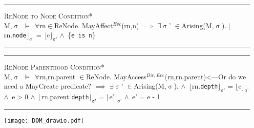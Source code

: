 \documentclass[a4paper,11pt, twoside,twocolumn]{article}
\newenvironment{logic}[1][]
{\begin{flushleft} \small }
{\end{flushleft}}
\newcommand{\loin}{$\in$}
\newcommand{\loforall}{$\forall$}
\newcommand{\loexists}{$\exists$}
\newcommand{\loand}{$\land$}
\newcommand{\loimplies}{$\implies$}
\newcommand{\losigma}{$\upsigma$}
\newcommand{\loturns} {$\vDash$}
\newcommand{\loexec}[2] {$\lfloor$#1$\rfloor _{\text{#2}}$}
\newcommand{\ablock} {\null\qquad}
\begin{document}
{\begin{logic} 
\hrule\null
\textsc{\normalsize *ReNode to Node Condition*}\\
M,\losigma\ \loturns\ \loforall rn\loin ReNode. MayAffect$^{Eve}$(rn,n)\linebreak
\ablock \loimplies \linebreak
\ablock \loexists \losigma' \loin Arising(M,\losigma).\linebreak
\ablock \ablock \loexec{rn.\texttt{node}}{\losigma'} = \loexec{e}{\losigma'} \loand\ \{\texttt{e is n}\}\linebreak
\hrule
\end{logic}

\begin{logic} 
\hrule\null
\textsc{\normalsize *ReNode Parenthood Condition*}\\
M,\losigma\ \loturns\ \loforall rn,rn.parent \loin ReNode. MayAccess$^{Dir,Eve}$(rn,rn.parent)<---Or do we need a MayCreate predicate?\linebreak
\ablock \loimplies \linebreak
\ablock \loexists \losigma' \loin Arising(M,\losigma).\linebreak
\ablock \loand\ \loexec{rn.\texttt{depth}}{\losigma'} = \loexec{e}{\losigma'} \loand\ e > 0\linebreak
\ablock \loand\ \loexec{rn.parent \texttt{depth}}{\losigma'} = \loexec{e'}{\losigma'} \loand\ e' = e - 1\linebreak
\hrule
\end{logic}

\begin{figure*}
\texttt{[image: DOM\_drawio.pdf]}
\end{figure*}

\small



\end{document}
